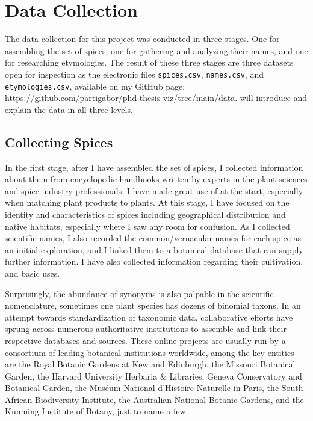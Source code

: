 \section{Data Collection}
\label{sec:data_collection}


The data collection for this project was conducted in three stages. One for assembling the set of spices, one for gathering and analyzing their names, and one for researching etymologies. The result of these three stages are three datasets open for inspection as the electronic files \texttt{spices.csv}, \texttt{names.csv}, and \texttt{etymologies.csv}, available on my GitHub page: \url{https://github.com/partigabor/phd-thesis-viz/tree/main/data}.  will introduce and explain the data in all three levels.

\subsection{Collecting Spices}
\label{sec:collecting_spices}

In the first stage, after I have assembled the set of spices, I collected information about them from encyclopedic handbooks written by experts in the plant sciences and spice industry professionals. I have made great use of \textcites{van_wyk_culinary_2014}{mabberley_mabberleys_2017}{hu_food_2005} at the start, especially when matching plant products to plants. At this stage, I have focused on the identity and characteristics of spices including geographical distribution and native habitats, especially where I saw any room for confusion. As I collected scientific names, I also recorded the common/vernacular names for each spice as an initial exploration, and I linked them to a botanical database that can supply further information. I have also collected information regarding their cultivation, and basic uses.

Surprisingly, the abundance of synonyms is also palpable in the scientific nomenclature, sometimes one plant species has dozens of binomial \glspl{taxon}. In an attempt towards standardization of taxonomic data, collaborative efforts have sprung across numerous authoritative institutions to assemble and link their respective databases and sources. These online projects are usually run by a consortium of leading botanical institutions worldwide, among the key entities are the Royal Botanic Gardens at Kew and Edinburgh, the Missouri Botanical Garden, the Harvard University Herbaria \& Libraries, Geneva Conservatory and Botanical Garden, the Muséum National d'Histoire Naturelle in Paris, the South African Biodiversity Institute, the Australian National Botanic Gardens, and the Kunming Institute of Botany, just to name a few.

